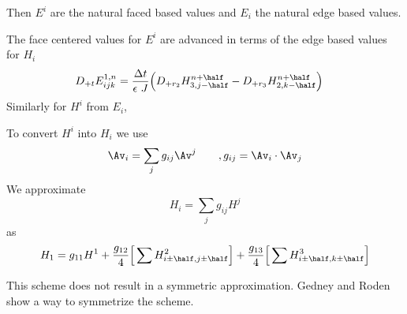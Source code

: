 \documentclass[10pt]{article}
\begin{document}
Then $E^i$ are the natural faced based values and $E_i$ the natural edge based values.

The face centered values for $E^i$ are advanced in terms of the edge based values for $H_i$
\begin{align*}
   D_{+t} E^{1,n}_{ijk} &=  {\dt\over\epsilon~J} \Big(D_{+ r_2} H^{n+\half}_{3,j-\half}
                        - D_{+ r_3} H^{n+\half}_{2,k-\half} \Big)
\end{align*}
Similarly for $H^i$ from $E_i$,

To convert $H^i$ into $H_i$ we use
\[
     \Av_i = \sum_j g_{ij} \Av^j \qquad, g_{ij}=\Av_i\cdot\Av_j
\]
We approximate
\[
   H_i = \sum_j g_{ij} H^j
\] 
as
\[
   H_1 = g_{11} H^1 + {g_{12}\over 4}\Big[ \sum H^2_{i\pm\half,j\pm\half} \Big]
                    + {g_{13}\over 4}\Big[ \sum H^3_{i\pm\half,k\pm\half} \Big]
\]

This scheme does not result in a symmetric approximation. Gedney and Roden show a way to
symmetrize the scheme.




\clearpage
\end{document}
